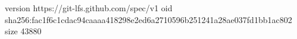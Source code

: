 version https://git-lfs.github.com/spec/v1
oid sha256:fac1f6c1cdac94caaaa418298e2ed6a2710596b251241a28ae037fd1bb1ac802
size 43880
